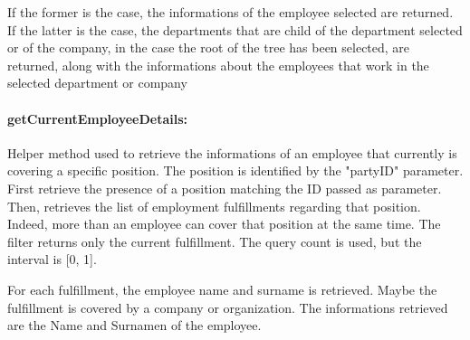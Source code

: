 If the former is the case, the informations of the employee selected are returned. If the latter is the case, the departments that are child of the department selected or of the company, in the case the root of the tree has been selected, are returned, along with the informations about the employees that work in the selected department or company



\paragraph{getCurrentEmployeeDetails:}

Helper method used to retrieve the informations of an employee that currently is covering a specific position.
The position is identified by the "partyID" parameter.
First retrieve the presence of a position matching the ID passed as parameter.
Then, retrieves the list of employment fulfillments regarding that position. Indeed, more than an employee can cover that position at the same time.
The filter returns only the current fulfillment.
The query count is used, but the interval is [0, 1].


For each fulfillment, the employee name and surname is retrieved.
Maybe the fulfillment is covered by a company or organization.
The informations retrieved are the Name and Surnamen of the employee.


